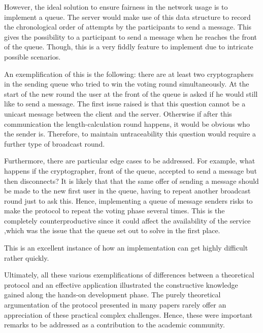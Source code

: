 However, the ideal solution to ensure fairness in the network usage is to implement a queue. The server would make use of this data structure to record the chronological order of attempts by the participants to send a message. This gives the possibility to a participant to send a message when he reaches the front of the queue. Though, this is a very fiddly feature to implement due to intricate possible scenarios. 


An exemplification of this is the following: there are at least two cryptographers in the sending queue who tried to win the voting round simultaneously. At the start of the new round the user at the front of the queue is asked if he would still like to send a message. The first issue raised is that this question cannot be a unicast message between the client and the server. Otherwise if after this communication the length-calculation round happens, it would be obvious who the sender is. Therefore, to maintain untraceability this question would require a further type of broadcast round. 

Furthermore, there are particular edge cases to be addressed. For example, what happens if the cryptographer, front of the queue, accepted to send a message but then disconnects? It is likely that that the same offer of sending a message should be made to the new first user in the queue, having to repeat another broadcast round just to ask this. Hence, implementing a queue of message senders risks to make the protocol to repeat the voting phase several times. This is the completely counterproductive since it could affect the availability of the service ,which was the issue that the queue set out to solve in the first place. 

This is an excellent instance of how an implementation can get highly difficult rather quickly. \newline \newline




Ultimately, all these various exemplifications of differences between a theoretical protocol and an effective application illustrated the constructive knowledge gained along the hands-on development phase. The purely theoretical argumentation of the protocol presented in many papers rarely offer an appreciation of these practical complex challenges. Hence, these were important remarks to be addressed as a contribution to the academic community.

